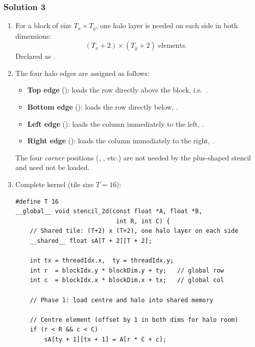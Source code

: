 \subsubsection{Solution 3}

\begin{enumerate}[label=(\alph*)]
  \item For a block of size $T_x \times T_y$, one halo layer is needed on
        each side in both dimensions:
        \[
          (T_x + 2) \times (T_y + 2) \text{ elements.}
        \]
        Declared as
        .

  \item The four halo edges are assigned as follows:
        \begin{itemize}
          \item \textbf{Top edge} (): loads the row directly
                above the block, i.e.\ .
          \item \textbf{Bottom edge} (): loads
                the row directly below, .
          \item \textbf{Left edge} (): loads the column
                immediately to the left, .
          \item \textbf{Right edge} (): loads
                the column immediately to the right, .
        \end{itemize}
        The four \emph{corner} positions (,
        , etc.) are not needed by the plus-shaped stencil
        and need not be loaded.

  \item Complete kernel (tile size $T = 16$):
\begin{lstlisting}
#define T 16
__global__ void stencil_2d(const float *A, float *B,
                            int R, int C) {
    // Shared tile: (T+2) x (T+2), one halo layer on each side
    __shared__ float sA[T + 2][T + 2];

    int tx = threadIdx.x,  ty = threadIdx.y;
    int r  = blockIdx.y * blockDim.y + ty;   // global row
    int c  = blockIdx.x * blockDim.x + tx;   // global col

    // Phase 1: load centre and halo into shared memory

    // Centre element (offset by 1 in both dims for halo room)
    if (r < R && c < C)
        sA[ty + 1][tx + 1] = A[r * C + c];


\end{lstlisting}
\end{enumerate}
